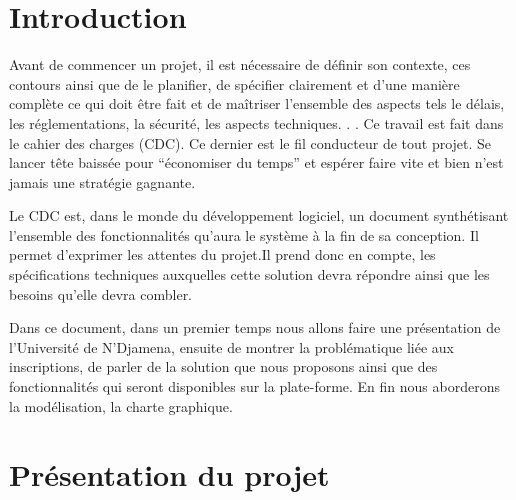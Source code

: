 \documentclass[12pt,a4paper]{article}
\begin{document}
	\newpage
	\section*{Introduction}
	Avant de commencer un projet, il est nécessaire de définir son contexte, ces contours ainsi que de le planifier, de spécifier clairement et d’une manière complète ce qui doit être fait et de maîtriser l’ensemble des aspects tels le délais, les réglementations, la sécurité, les aspects techniques. . . Ce travail est fait dans le cahier des charges (CDC). Ce dernier est le fil conducteur de tout projet. Se lancer tête baissée pour “économiser du temps” et espérer faire vite et bien n’est jamais une stratégie gagnante.
	
	
	Le CDC est, dans le monde du développement logiciel, un document synthétisant l’ensemble des
	fonctionnalités qu’aura le système à la fin de sa conception. Il
	permet d’exprimer les attentes du projet.Il prend donc en
	compte, les spécifications techniques auxquelles cette solution
	devra répondre ainsi que les besoins qu’elle devra combler.
	
	Dans ce document, dans un premier temps nous allons faire une présentation de l'Université de N'Djamena, ensuite de montrer la problématique liée aux inscriptions, de parler de la solution que nous proposons ainsi que des fonctionnalités qui seront disponibles sur la plate-forme. En fin nous aborderons la modélisation, la charte graphique.
	\pagebreak
	
	\setcounter{section}{0}
	\section{Présentation du projet}
\end{document}
